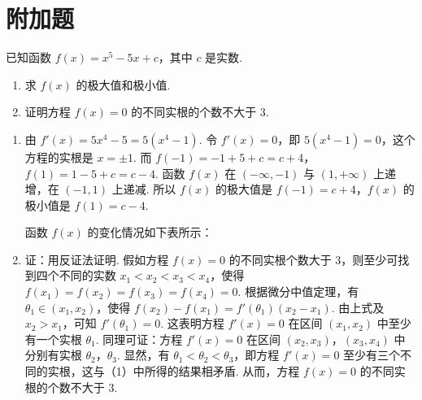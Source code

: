 \section{附加题}

\begin{problem}

已知函数 \(f(x)=x^{5}-5x+c \)，其中 \(c\) 是实数.

\begin{enumerate}
\item 求 \(f(x)\) 的极大值和极小值.
\item 证明方程 \(f(x)=0\) 的不同实根的个数不大于 \(3\).
\end{enumerate}
\end{problem}

\begin{solution}
\begin{enumerate}
\item 由 \(f'(x)=5x^{4}-5=5(x^{4}-1)\). 令 \(f'(x)=0\)，即 \(5(x^{4}-1)=0\)，这个方程的实根是 \(x=\pm1\). 而
\(f(-1) = -1 + 5 + c = c + 4\)，\(f(1) = 1 - 5 + c = c - 4\).
函数 \(f(x)\) 在 \((-\infty,-1)\) 与 \((1,+\infty)\) 上递增，在 \((-1,1)\) 上递减. 所以 \(f(x)\) 的极大值是 \(f(-1)=c+4\)，\(f(x)\) 的极小值是 \(f(1)=c-4\).

函数 \(f(x)\) 的变化情况如下表所示：


\item 证：用反证法证明. 假如方程 \(f(x) = 0\) 的不同实根个数大于 \(3\)，则至少可找到四个不同的实数 \(x_{1} < x_{2} < x_{3} < x_{4}\)，使得
\(f(x_{1}) = f(x_{2}) = f(x_{3}) = f(x_{4}) = 0\).
根据微分中值定理，有 \(\theta_{1}\in(x_{1},x_{2})\)，使得
\(f(x_{2}) - f(x_{1}) = f'(\theta_{1})(x_{2} - x_{1})\).
由上式及 \(x_{2} > x_{1}\)，可知 \(f'(\theta_1) = 0\). 这表明方程 \(f'(x) = 0\) 在区间 \((x_{1},x_{2})\) 中至少有一个实根 \(\theta_{1}\). 同理可证：方程 \(f'(x)=0\) 在区间 \((x_{2}, x_{3})\)，\((x_{3}, x_{4})\) 中分别有实根 \(\theta_{2}\)，\(\theta_{3}\). 显然，有 \(\theta_{1}<\theta_{2}<\theta_{3}\)，即方程 \(f'(x)=0\) 至少有三个不同的实根，这与（1）中所得的结果相矛盾. 从而，方程 \(f(x)=0\) 的不同实根的个数不大于 \(3\).
\end{enumerate}
\end{solution}
